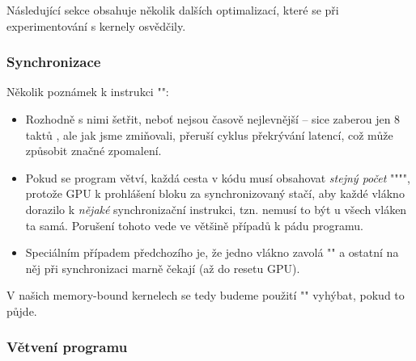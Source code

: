     Následující sekce obsahuje několik dalších optimalizací, které se při experimentování s kernely osvědčily. 

        \subsubsection{Synchronizace}

        Několik poznámek k instrukci \Vr"":
        \begin{itemize}
          \item Rozhodně s nimi šetřit, neboť nejsou časově nejlevnější -- sice zaberou jen 8 taktů \cite{CUDA programming g.}, ale jak jsme zmiňovali, přeruší cyklus překrývání latencí, což může způsobit značné zpomalení.
          \item Pokud se program větví, každá cesta v kódu musí obsahovat \emph{stejný počet} \Vr""\linebreak\Vr"", protože GPU k prohlášení bloku za synchronizovaný stačí, aby každé vlákno dorazilo k \emph{nějaké} synchronizační instrukci, tzn. nemusí to být u všech vláken ta samá. Porušení tohoto vede ve většině případů k pádu programu.
          \item Speciálním případem předchozího je, že jedno vlákno zavolá \Vr"" a ostatní na něj při synchronizaci marně čekají (až do resetu GPU).
        \end{itemize}
        V našich memory-bound kernelech se tedy budeme použití \Vr"" vyhýbat, pokud to půjde.

        \subsubsection{Větvení programu}\label{vetvení}

